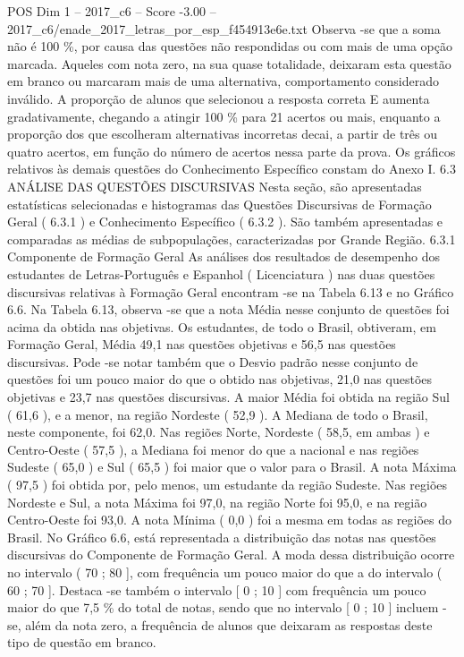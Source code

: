 \begin{textsample}{POS Dim 1 – 2017\_c6 – Score -3.00 – 2017\_c6/enade\_2017\_letras\_por\_esp\_f454913e6e.txt}
Observa -se que a soma não é 100 \%, por causa das questões não respondidas ou com mais de uma opção marcada.
Aqueles com nota zero, na sua quase totalidade, deixaram esta questão em branco ou marcaram mais de uma alternativa, comportamento considerado inválido.
A proporção de alunos que selecionou a resposta correta E aumenta gradativamente, chegando a atingir 100 \% para 21 acertos ou mais, enquanto a proporção dos que escolheram alternativas incorretas decai, a partir de três ou quatro acertos, em função do número de acertos nessa parte da prova.
Os gráficos relativos às demais questões do Conhecimento Específico constam do Anexo I. 6.3 ANÁLISE DAS QUESTÕES DISCURSIVAS Nesta seção, são apresentadas estatísticas selecionadas e histogramas das Questões Discursivas de Formação Geral ( 6.3.1 ) e Conhecimento Específico ( 6.3.2 ).
São também apresentadas e comparadas as médias de subpopulações, caracterizadas por Grande Região. 6.3.1 Componente de Formação Geral As análises dos resultados de desempenho dos estudantes de Letras-Português e Espanhol ( Licenciatura ) nas duas questões discursivas relativas à Formação Geral encontram -se na Tabela 6.13 e no Gráfico 6.6.
Na Tabela 6.13, observa -se que a nota Média nesse conjunto de questões foi acima da obtida nas objetivas.
Os estudantes, de todo o Brasil, obtiveram, em Formação Geral, Média 49,1 nas questões objetivas e 56,5 nas questões discursivas.
Pode -se notar também que o Desvio padrão nesse conjunto de questões foi um pouco maior do que o obtido nas objetivas, 21,0 nas questões objetivas e 23,7 nas questões discursivas.
A maior Média foi obtida na região Sul ( 61,6 ), e a menor, na região Nordeste ( 52,9 ).
A Mediana de todo o Brasil, neste componente, foi 62,0.
Nas regiões Norte, Nordeste ( 58,5, em ambas ) e Centro-Oeste ( 57,5 ), a Mediana foi menor do que a nacional e nas regiões Sudeste ( 65,0 ) e Sul ( 65,5 ) foi maior que o valor para o Brasil.
A nota Máxima ( 97,5 ) foi obtida por, pelo menos, um estudante da região Sudeste.
Nas regiões Nordeste e Sul, a nota Máxima foi 97,0, na região Norte foi 95,0, e na região Centro-Oeste foi 93,0.
A nota Mínima ( 0,0 ) foi a mesma em todas as regiões do Brasil.
No Gráfico 6.6, está representada a distribuição das notas nas questões discursivas do Componente de Formação Geral.
A moda dessa distribuição ocorre no intervalo ( 70 ; 80 ], com frequência um pouco maior do que a do intervalo ( 60 ; 70 ].
Destaca -se também o intervalo [ 0 ; 10 ] com frequência um pouco maior do que 7,5 \% do total de notas, sendo que no intervalo [ 0 ; 10 ] incluem -se, além da nota zero, a frequência de alunos que deixaram as respostas deste tipo de questão em branco.

\end{textsample}
